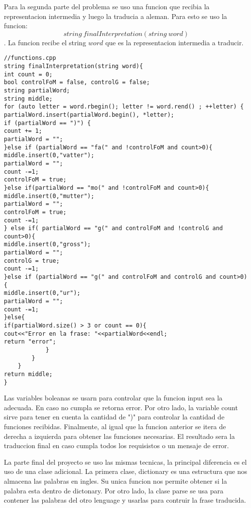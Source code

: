 \documentclass[conference]{IEEEtran}
\begin{document}
Para la segunda parte del problema se uso una funcion que recibia la representacion intermedia y luego la traducia a aleman. Para esto se uso la funcion: 
$$string\  finalInterpretation(string\  word) $$
. La funcion recibe el string $word$ que es la representacion intermedia a traducir. 

\begin{lstlisting}
//functions.cpp
string finalInterpretation(string word){
int count = 0;
bool controlFoM = false, controlG = false;
string partialWord;
string middle;
for (auto letter = word.rbegin(); letter != word.rend() ; ++letter) {
partialWord.insert(partialWord.begin(), *letter);
if (partialWord == ")") {
count += 1;
partialWord = "";
}else if (partialWord == "fa(" and !controlFoM and count>0){
middle.insert(0,"vatter");
partialWord = "";
count -=1;
controlFoM = true;
}else if(partialWord == "mo(" and !controlFoM and count>0){
middle.insert(0,"mutter");
partialWord = "";
controlFoM = true;
count -=1;
} else if( partialWord == "g(" and controlFoM and !controlG and count>0){
middle.insert(0,"gross");
partialWord = "";
controlG = true;
count -=1;
}else if (partialWord == "g(" and controlFoM and controlG and count>0){
middle.insert(0,"ur");
partialWord = "";
count -=1;
}else{
if(partialWord.size() > 3 or count == 0){
cout<<"Error en la frase: "<<partialWord<<endl;
return "error";
			}
		}
	}
return middle;
}
\end{lstlisting}

Las variables boleanas se usarn para controlar que la funcion input sea la adecuada. En caso no cumpla se retorna error. Por otro lado, la variable count sirve para tener en cuenta la cantidad de ")" para controlar la cantidad de funciones recibidas. Finalmente, al igual que la funcion anterior se itera de derecha a izquierda para obtener las funciones necesarias. El resultado sera la traduccion final en caso cumpla todos los requisistos o un mensaje de error.

La parte final del proyecto se uso las mismas tecnicas, la principal diferencia es el uso de una clase adicional. La primera clase, dictionary es una estructura que nos almacena las palabras en ingles. Su unica funcion nos permite obtener si la palabra esta dentro de dictonary. Por otro lado, la clase parse se usa para contener las palabras del otro lenguage y usarlas para contruir la frase traducida.
\end{document}
